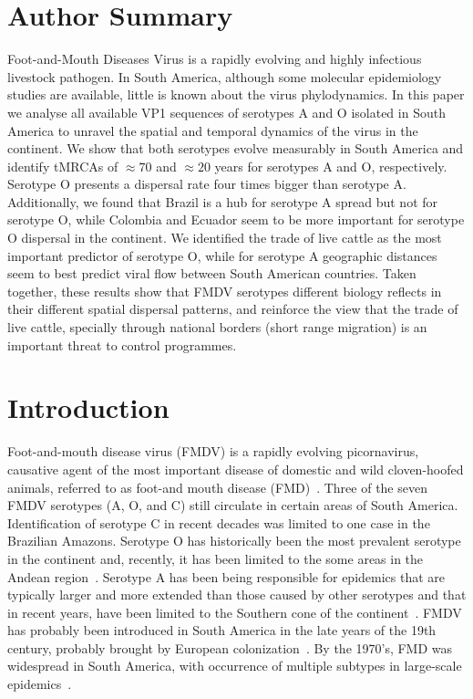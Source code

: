 \documentclass[10pt]{article}
\begin{document}
\section*{Author Summary} %
Foot-and-Mouth Diseases Virus is a rapidly evolving and highly infectious livestock pathogen.
In South America, although some molecular epidemiology studies are available, little is known about the virus phylodynamics.
In this paper we analyse all available VP1 sequences of serotypes A and O isolated in South America to unravel the spatial and temporal dynamics of the virus in the continent.
We show that both serotypes evolve measurably in South America and identify tMRCAs of $\approx 70$ and $\approx 20$ years for serotypes A and O, respectively. 
Serotype O presents a dispersal rate four times bigger than serotype A.
Additionally, we found that Brazil is a hub for serotype A spread but not for serotype O, while Colombia and Ecuador seem to be more important for serotype O dispersal in the continent.
We identified the trade of live cattle as the most important predictor of serotype O, while for serotype A geographic distances seem to best predict viral flow between South American countries.
Taken together, these results show that FMDV serotypes different biology reflects in their different spatial dispersal patterns, and reinforce the view that the trade of live cattle, specially through national borders (short range migration) is an important threat to control programmes.   

\section*{Introduction}

Foot-and-mouth disease virus (FMDV) is a rapidly evolving picornavirus, causative agent of the most important disease of domestic and wild cloven-hoofed animals, referred to as foot-and mouth disease (FMD)~\cite{review}.
Three of the seven FMDV serotypes (A, O, and C) still circulate in certain areas of South America.
Identification of serotype C in recent decades was limited to one case in the Brazilian Amazons.
Serotype O has historically been the most prevalent serotype in the continent and, recently, it has been limited to the  some areas in the Andean region~\cite{andean}.
Serotype A has been being responsible for epidemics that are typically larger and more extended than those caused by other serotypes and that in recent years, have been limited to the Southern cone of the continent~\cite{Perez2001,Malirat2012}.
FMDV has probably been introduced in South America in the late years of the 19th century, probably brought by European colonization~\cite{tully}. 
By the 1970's, FMD was widespread in South America, with occurrence of multiple subtypes in large-scale epidemics~\cite{Saraiva2003}.
\end{document}
